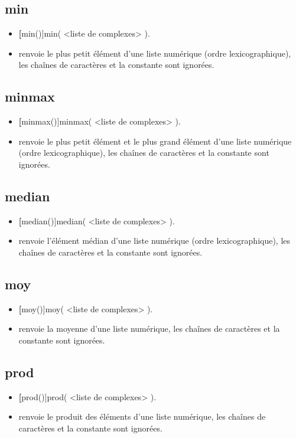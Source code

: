 \subsection{min}
\begin{itemize}
 \item \util \textbf[min()]{min( <liste de complexes> )}.
 \item \desc renvoie le plus petit élément d'une liste numérique (ordre lexicographique), les chaînes de caractères et la constante \jump sont ignorées.
\end{itemize}

\subsection{minmax}
\begin{itemize}
 \item \util \textbf[minmax()]{minmax( <liste de complexes> )}.
 \item \desc renvoie le plus petit élément et le plus grand élément d'une liste numérique (ordre lexicographique), les chaînes de caractères et la constante \jump sont ignorées.
\end{itemize}

\subsection{median}
\begin{itemize}
 \item \util \textbf[median()]{median( <liste de complexes> )}.
 \item \desc renvoie l'élément médian d'une liste numérique (ordre lexicographique), les chaînes de caractères et la constante \jump sont ignorées.
\end{itemize}

\subsection{moy}
\begin{itemize}
 \item \util \textbf[moy()]{moy( <liste de complexes> )}.
 \item \desc renvoie la moyenne d'une liste numérique, les chaînes de caractères et la constante \jump sont ignorées.
\end{itemize}

\subsection{prod}
\begin{itemize}
 \item \util \textbf[prod()]{prod( <liste de complexes> )}.
 \item \desc renvoie le produit des éléments d'une liste numérique, les chaînes de caractères et la constante \jump sont ignorées.
\end{itemize}

